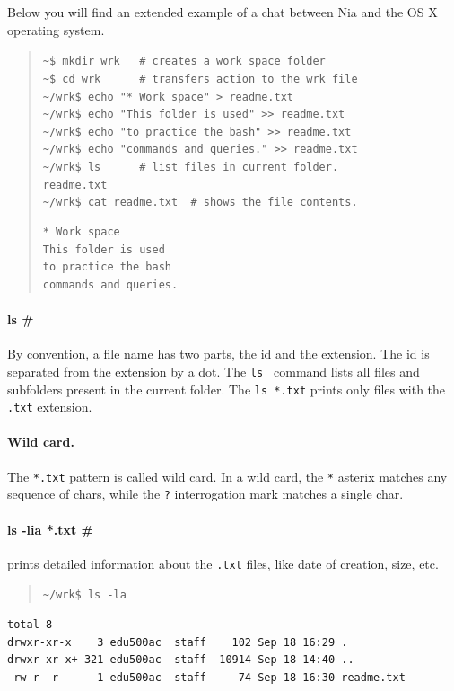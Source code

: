 \documentclass[a4paper,12pt]{book}
\begin{document}
Below you will find
an extended example of a chat between Nia and
the OS X operating system.
\begin{quote}
\verb|~$ mkdir wrk   # creates a work space folder      | \\
\verb|~$ cd wrk      # transfers action to the wrk file | \\
\verb|~/wrk$ echo "* Work space" > readme.txt | \\
\verb|~/wrk$ echo "This folder is used" >> readme.txt |\\
\verb|~/wrk$ echo "to practice the bash" >> readme.txt | \\
\verb|~/wrk$ echo "commands and queries." >> readme.txt | \\
\verb|~/wrk$ ls      # list files in current folder. | \\
\verb|readme.txt |\\
\verb|~/wrk$ cat readme.txt  # shows the file contents.| 
\begin{verbatim}
* Work space
This folder is used
to practice the bash
commands and queries.
\end{verbatim}
\end{quote}

\paragraph{ls \#} 
By convention, a file name has
two parts, the id and the extension. The id
is separated from the extension by a dot.
The \verb|ls | command lists all files
and subfolders present in the current folder.
The \verb|ls *.txt| prints only files
with the \verb|.txt| extension.

\paragraph{Wild card.} The 
\verb|*.txt| pattern
is called wild card.
In a wild card, the \verb|*| asterix matches
any sequence of chars, while the \verb|?|
interrogation mark matches a single char.

\paragraph{ls -lia *.txt \#} prints detailed
information about the \verb|.txt| files,
like date of creation, size, etc.
\begin{quote}
\verb|~/wrk$ ls -la |  
\end{quote}
\begin{verbatim}
total 8
drwxr-xr-x    3 edu500ac  staff    102 Sep 18 16:29 .
drwxr-xr-x+ 321 edu500ac  staff  10914 Sep 18 14:40 ..
-rw-r--r--    1 edu500ac  staff     74 Sep 18 16:30 readme.txt
\end{verbatim}
\end{document}
